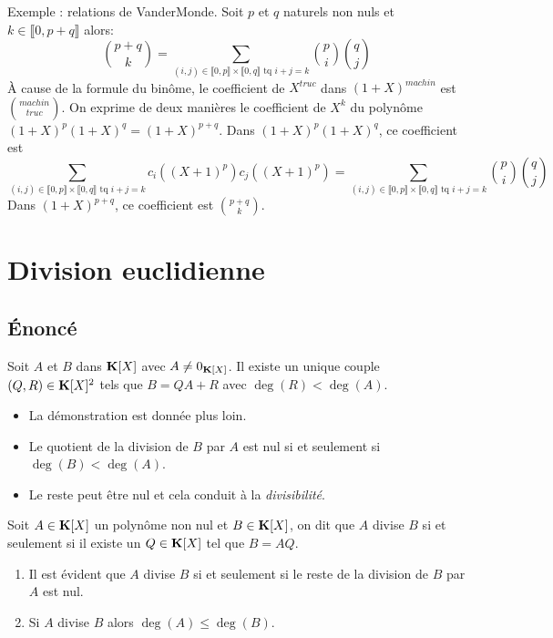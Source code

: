 Exemple : relations de VanderMonde.\newline
Soit $p$ et $q$ naturels non nuls et $k\in \llbracket 0, p+q\rrbracket$ alors:
\begin{displaymath}
  \binom{p+q}{k} = \sum_{(i,j)\in \llbracket 0,p \rrbracket \times \llbracket 0, q \rrbracket \text{ tq } i+j =k}\binom{p}{i}\binom{q}{j} 
\end{displaymath}
\`A cause de la formule du binôme, le coefficient de $X^{truc}$ dans $(1+X)^{machin}$ est $\binom{machin}{truc}$. On exprime de deux manières le coefficient de $X^k$ du polynôme $(1+X)^p(1+X)^q = (1+X)^{p+q}$.\newline
Dans $(1+X)^p(1+X)^q$, ce coefficient est 
\begin{displaymath}
  \sum_{(i,j)\in \llbracket 0,p \rrbracket \times \llbracket 0, q \rrbracket \text{ tq } i+j =k} c_i((X+1)^p)c_j((X+1)^p)
  = \sum_{(i,j)\in \llbracket 0,p \rrbracket \times \llbracket 0, q \rrbracket \text{ tq } i+j =k}\binom{p}{i}\binom{q}{j}
\end{displaymath}
Dans $(1+X)^{p+q}$, ce coefficient est $\binom{p+q}{k}$.

\section{Division euclidienne}
\subsection{\'Enoncé}
\begin{prop}
 Soit $A$ et $B$ dans $\mathbf{K}[X]$ avec $A\neq 0_{\mathbf{K}[X]}$. Il existe un unique couple $(Q,R)\in \mathbf{K}[X]^2$ tels que $B=QA+R$ avec $\deg(R)<\deg(A)$.
\end{prop}
\begin{rems}
 \begin{itemize}
  \item La démonstration est donnée plus loin.
  \item Le quotient de la division de $B$ par $A$ est nul si et seulement si $\deg(B) < \deg(A)$.
  \item Le reste peut être nul et cela conduit à la \emph{divisibilité}.
 \end{itemize}
\end{rems}

\begin{defi}
 Soit $A\in \mathbf{K}[X]$ un polynôme non nul et $B\in \mathbf{K}[X]$, on dit que $A$ divise $B$ si et seulement si il existe un $Q\in \mathbf{K}[X]$ tel que $B=AQ$.
\end{defi}
\begin{rems}
\begin{enumerate}
 \item  Il est évident que $A$ divise $B$ si et seulement si le reste de la division de $B$ par $A$ est nul.
 \item Si $A$ divise $B$ alors $\deg(A)\leq \deg(B)$. 
\end{enumerate}
\end{rems}

